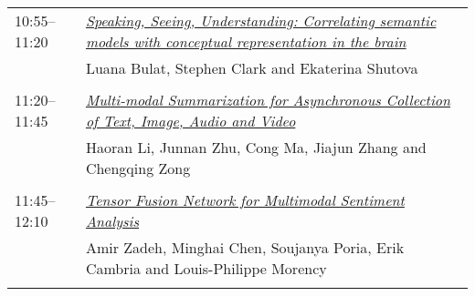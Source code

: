 \begin{tabular}{p{20mm}p{128mm}}
10:55--11:20 & \hyperlink{page.1090}{\em Speaking, Seeing, Understanding: Correlating semantic models with conceptual representation in the brain}\\
         & Luana Bulat, Stephen Clark and Ekaterina Shutova \\
\\

11:20--11:45 & \hyperlink{page.1101}{\em Multi-modal Summarization for Asynchronous Collection of Text, Image, Audio and Video}\\
         & Haoran Li, Junnan Zhu, Cong Ma, Jiajun Zhang and Chengqing Zong \\
\\

11:45--12:10 & \hyperlink{page.1112}{\em Tensor Fusion Network for Multimodal Sentiment Analysis}\\
         & Amir Zadeh, Minghai Chen, Soujanya Poria, Erik Cambria and Louis-Philippe Morency \\
\\

\end{tabular}
\newpage
